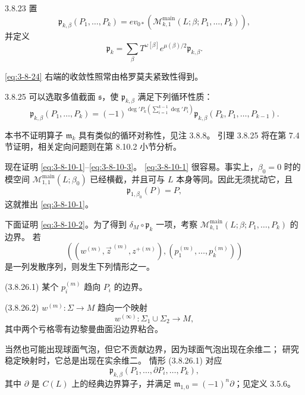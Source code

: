 \begin{definition}{3.8.23}\label{def:3-8-23}
置
\[
 \mathfrak p_{k,\beta}(P_1,\ldots,P_k)
 =
 ev_{0*}\!\left(
 \mathcal M_{k,1}^{\mathrm{main}}
 (L;\beta;P_1,\ldots,P_k)
 \right),
\]
并定义
\begin{equation}
 \mathfrak p_k
 =
 \sum_\beta
 T^{\omega[\beta]}e^{\mu(\beta)/2}\mathfrak p_{k,\beta}.
\tag{3.8.24}\label{eq:3-8-24}
\end{equation}
\end{definition}

\eqref{eq:3-8-24} 右端的收敛性照常由格罗莫夫紧致性得到。

\begin{lemma}{3.8.25}\label{lem:3-8-25}
可以选取多值截面 $\mathfrak s$，使
$\mathfrak p_{k,\beta}$ 满足下列循环性质：
\[
 \mathfrak p_{k,\beta}(P_1,\ldots,P_k)
 =
 (-1)^{
  \deg'P_k\left(\sum_{i=1}^{k-1}\deg'P_i\right)}
 \mathfrak p_{k,\beta}(P_k,P_1,\ldots,P_{k-1}).
\]
\end{lemma}

本书不证明算子 $\mathfrak m_k$ 具有类似的循环对称性，见注 3.8.8。
引理 3.8.25 将在第 7.4 节证明，相关定向问题则在第 8.10.2 小节分析。

现在证明 \eqref{eq:3-8-10-1}--\eqref{eq:3-8-10-3}。
\eqref{eq:3-8-10-1} 很容易。事实上，$\beta_0=0$ 时的模空间
$\mathcal M_{1,1}^{\mathrm{main}}(L;\beta_0)$ 已经横截，并且可与 $L$
本身等同。因此无须扰动它，且
\[
 \mathfrak p_{1,\beta_0}(P)=P,
\]
这就推出 \eqref{eq:3-8-10-1}。

下面证明 \eqref{eq:3-8-10-2}。为了得到
$\delta_M\circ\mathfrak p_k$ 一项，考察
$\mathcal M_{k,1}^{\mathrm{main}}(L;\beta;P_1,\ldots,P_k)$ 的边界。
若
\[
 \left(
  (w^{(m)},\vec z^{\,(m)},z^{+(m)}),
  (p_1^{(m)},\ldots,p_k^{(m)})
 \right)
\]
是一列发散序列，则发生下列情形之一。

\smallskip
\noindent\textup{(3.8.26.1)}
某个 $p_i^{(m)}$ 趋向 $P_i$ 的边界。

\noindent\textup{(3.8.26.2)}
$w^{(m)}\colon\Sigma\to M$ 趋向一个映射
\[
 w^{(\infty)}\colon\Sigma_1\cup\Sigma_2\longrightarrow M,
\]
其中两个亏格零有边黎曼曲面沿边界粘合。

\smallskip
当然也可能出现球面气泡，但它不贡献边界，因为球面气泡出现在余维二；
研究稳定映射时，它总是出现在实余维二。
情形 (3.8.26.1) 对应
\[
 \mathfrak p_{k,\beta}
 (P_1,\ldots,\partial P_i,\ldots,P_k),
\]
其中 $\partial$ 是 $C(L)$ 上的经典边界算子，并满足
$\mathfrak m_{1,0}=(-1)^n\partial$；见定义 3.5.6。

